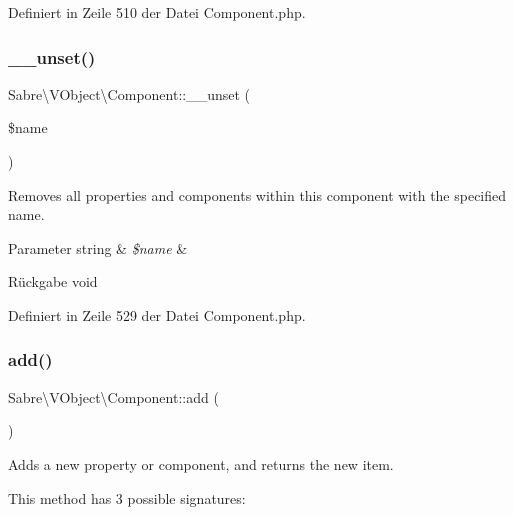Definiert in Zeile 510 der Datei Component.\+php.

\mbox{\label{class_sabre_1_1_v_object_1_1_component_af3ef2628c178c2ccc0e10396931c8046}} 
\subsubsection{\texorpdfstring{\+\_\+\+\_\+unset()}{\_\_unset()}}
{\footnotesize\ttfamily Sabre\textbackslash{}\+V\+Object\textbackslash{}\+Component\+::\+\_\+\+\_\+unset (\begin{DoxyParamCaption}\item[{}]{\$name }\end{DoxyParamCaption})}

Removes all properties and components within this component with the specified name.


\begin{DoxyParams}[1]{Parameter}
string & {\em \$name} & \\
\hline
\end{DoxyParams}
\begin{DoxyReturn}{Rückgabe}
void 
\end{DoxyReturn}


Definiert in Zeile 529 der Datei Component.\+php.

\mbox{\label{class_sabre_1_1_v_object_1_1_component_a9e36d040e981cf1b073553611b2db4d2}} 
\subsubsection{\texorpdfstring{add()}{add()}}
{\footnotesize\ttfamily Sabre\textbackslash{}\+V\+Object\textbackslash{}\+Component\+::add (\begin{DoxyParamCaption}{ }\end{DoxyParamCaption})}

Adds a new property or component, and returns the new item.

This method has 3 possible signatures\+:

